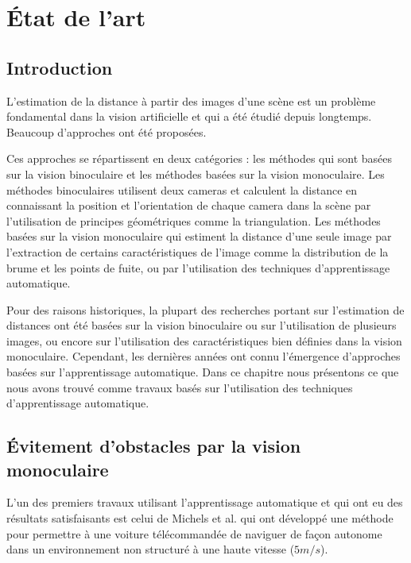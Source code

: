 \let\caption\oldcaption
\chapter{\'Etat de l'art}


\section{Introduction}

L'estimation de la distance à partir des images d'une scène est un problème
fondamental dans la vision artificielle et qui a été étudié depuis longtemps.
Beaucoup d'approches ont été proposées.

Ces approches se répartissent en deux catégories : les méthodes qui sont basées
sur la vision binoculaire et les méthodes basées sur la vision monoculaire.
Les méthodes binoculaires utilisent deux cameras et calculent la distance
en connaissant la position et l'orientation de chaque camera dans la scène
par l'utilisation de principes géométriques comme la triangulation. Les
méthodes basées sur la vision monoculaire qui estiment la distance d'une seule
image par l'extraction de certains caractéristiques de l'image comme la
distribution de la brume et les points de fuite, ou par l'utilisation des
techniques d'apprentissage automatique.

Pour des raisons historiques, la plupart des recherches portant sur l'estimation
de distances ont été basées sur la vision binoculaire ou sur l'utilisation de
plusieurs images, ou encore sur l'utilisation des caractéristiques bien définies
dans la vision monoculaire. Cependant, les dernières années ont connu
l'émergence d'approches basées sur l'apprentissage automatique.
Dans ce chapitre nous présentons ce que nous avons trouvé comme travaux basés
sur l'utilisation des techniques d'apprentissage automatique.

\section{\'Evitement d'obstacles par la vision monoculaire}

L'un des premiers travaux utilisant l'apprentissage automatique et qui ont eu
des résultats satisfaisants est celui de Michels et al.\cite{michels2005high}
qui ont développé une méthode pour permettre à une voiture télécommandée de
naviguer de façon autonome dans un environnement non structuré à une haute
vitesse ($5m/s$).

